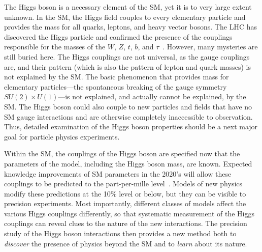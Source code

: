 \documentclass[%
 reprint,
 amsmath,amssymb,
 aps,
]{revtex4-1}
\begin{document}
The Higgs boson is a necessary element of the SM, yet it is to very large extent unknown.    In the SM, the Higgs field
couples to every elementary particle and provides the mass for all
quarks, leptons, and heavy vector bosons.   The LHC has discovered
the Higgs particle and confirmed the presence of the couplings responsible for the
masses of the $W$, $Z$, $t$, $b$, and $\tau$~\cite{LHCHiggssummary}. 
 However, many mysteries are still
buried here.   The Higgs couplings are not universal, as the gauge
couplings are, and their pattern (which is also the pattern of lepton
and quark masses) is not explained by the SM.  The basic phenomenon that provides
mass for elementary particles---the spontaneous breaking of the gauge
symmetry $SU(2)\times U(1)$---is not explained, and actually cannot be
explained, by the SM.   The Higgs boson could also couple to new
particles and fields that have no SM gauge interactions and are
otherwise completely inaccessible to observation.  Thus, detailed
examination of the Higgs boson properties should be a next major
goal for particle physics experiments.

Within the SM, the couplings of the Higgs boson are specified now that
the parameters of the model, including the Higgs boson mass, are
known.  Expected knowledge improvements of SM parameters in the 2020's will allow these couplings to be predicted to the part-per-mille level~\cite{Lepage:2014fla}.
Models of new physics modify these predictions at the 10\% level or below, but they can
be visible to precision experiments.   Most importantly, different
classes of models affect the various Higgs couplings differently, so that
systematic measurement of the Higgs couplings can reveal clues to the
nature of the new interactions.   The precision study of the
Higgs boson interactions then provides a new method both to {\it discover}  the
presence of physics beyond the SM and to {\it learn}  about its nature.
\end{document}
